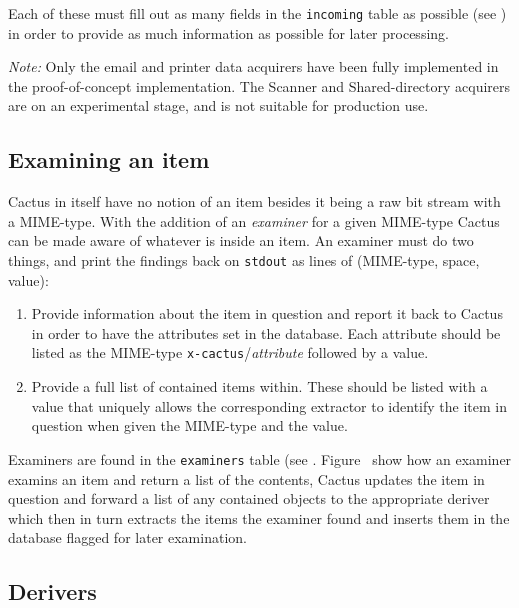 Each of these must fill out as many fields in the
\texttt{incoming} table as possible (see
) in order to provide as much
information as possible for later processing.  

\textit{Note:} Only the email and printer data acquirers
have been fully implemented in the proof-of-concept
implementation.  The Scanner and Shared-directory acquirers
are on an experimental stage, and is not suitable for
production use.


\subsection{Examining an item}

Cactus in itself have no notion of an item besides it being
a raw bit stream with a MIME-type.  With the addition of an
\textit{examiner} for a given MIME-type Cactus can be made
aware of whatever is inside an item.  An examiner must do
two things, and print the findings back on \texttt{stdout}
as lines of (MIME-type, space, value):

\begin{enumerate}
\item Provide information about the item in question and
  report it back to Cactus in order to have the attributes
  set in the database.  Each attribute should be listed as
  the MIME-type \texttt{x-cactus}/\textit{attribute}
  followed by a value.
  
\item Provide a full list of contained items within.  These
  should be listed with a value that uniquely allows the
  corresponding extractor to identify the item in question
  when given the MIME-type and the value.
\end{enumerate}


Examiners are found in the \texttt{examiners} table (see
.  Figure~
show how an examiner examins an item and return a list of
the contents, Cactus updates the item in question and
forward a list of any contained objects to the appropriate
deriver which then in turn extracts the items the examiner
found and inserts them in the database flagged for later
examination.

\subsection{Derivers}

